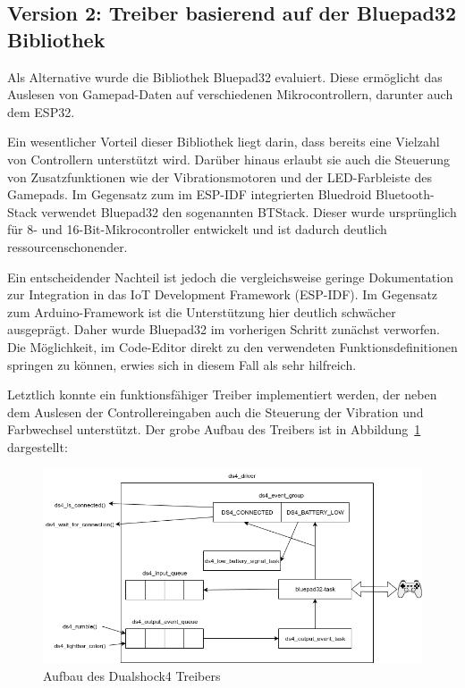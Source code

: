 \subsection{Version 2: Treiber basierend auf der Bluepad32 Bibliothek}

Als Alternative wurde die Bibliothek Bluepad32 evaluiert. Diese ermöglicht das Auslesen von Gamepad-Daten auf verschiedenen Mikrocontrollern, darunter auch dem ESP32.

Ein wesentlicher Vorteil dieser Bibliothek liegt darin, dass bereits eine Vielzahl von Controllern unterstützt wird. 
Darüber hinaus erlaubt sie auch die Steuerung von Zusatzfunktionen wie der Vibrationsmotoren und der LED-Farbleiste des Gamepads. 
Im Gegensatz zum im ESP-IDF integrierten Bluedroid Bluetooth-Stack verwendet Bluepad32 den sogenannten BTStack.
Dieser wurde ursprünglich für 8- und 16-Bit-Mikrocontroller entwickelt und ist dadurch deutlich ressourcenschonender. \cite{BTStack}

Ein entscheidender Nachteil ist jedoch die vergleichsweise geringe Dokumentation zur Integration in das IoT Development Framework (ESP-IDF). 
Im Gegensatz zum Arduino-Framework ist die Unterstützung hier deutlich schwächer ausgeprägt. 
Daher wurde Bluepad32 im vorherigen Schritt zunächst verworfen. 
Die Möglichkeit, im Code-Editor direkt zu den verwendeten Funktionsdefinitionen springen zu können, erwies sich in diesem Fall als sehr hilfreich. \cite{bluepad32}

Letztlich konnte ein funktionsfähiger Treiber implementiert werden, der neben dem Auslesen der Controllereingaben auch die Steuerung der Vibration und Farbwechsel unterstützt.
Der grobe Aufbau des Treibers ist in Abbildung~\ref{fig:ds4_driver} dargestellt:

\begin{figure}[ht]
    \centering
    \includegraphics[width=\textwidth]{images/becker_esp32_ds4_driver.png}
    \caption{Aufbau des Dualshock4 Treibers}
    \label{fig:ds4_driver}
\end{figure}

